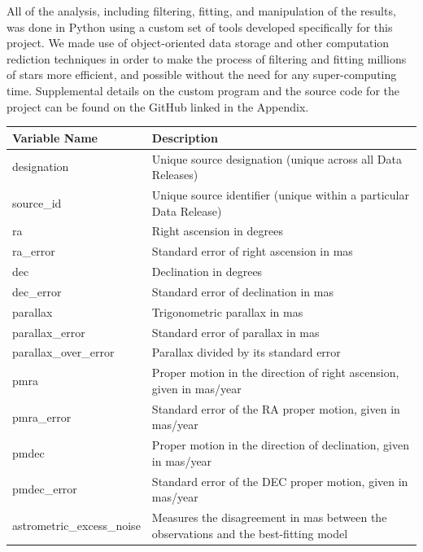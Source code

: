 \documentclass[onecolumn,table,xcdraw,super]{aastex631}
\begin{document}
All of the analysis, including filtering, fitting, and manipulation of the results, was done in Python using a custom set of tools developed specifically for this project. We made use of object-oriented data storage and other computation rediction techniques in order to make the process of filtering and fitting millions of stars more efficient, and possible without the need for any super-computing time. Supplemental details on the custom program and the source code for the project can be found on the GitHub linked in the Appendix.

\begin{table}[] \label{tab:variables}
\centering
{}
\begin{tabular}{ll}
\toprule
Variable Name                & Description \\
\midrule
designation                  &  Unique source designation (unique across all Data Releases)           \\
source\_id                    & Unique source identifier (unique within a particular Data Release)            \\
ra                           &  Right ascension in degrees           \\
ra\_error                     & Standard error of right ascension in mas            \\
dec                          &  Declination in degrees           \\
dec\_error                    &  Standard error of declination in mas           \\
parallax                     &  Trigonometric parallax in mas           \\
parallax\_error               &  Standard error of parallax in mas           \\
parallax\_over\_error          & Parallax divided by its standard error            \\
pmra                         &  Proper motion in the direction of right ascension, given in mas/year        \\
pmra\_error                   &  Standard error of the RA proper motion, given in mas/year           \\
pmdec                        & Proper motion in the direction of declination, given in mas/year             \\
pmdec\_error                  & Standard error of the DEC proper motion, given in mas/year           \\
astrometric\_excess\_noise     & Measures the disagreement in mas between the observations and the best-fitting model            \\

\end{tabular}
\end{table}
\end{document}
